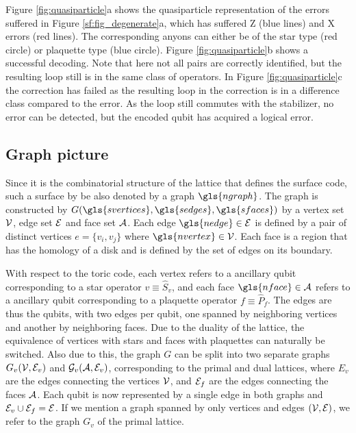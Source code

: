 Figure \ref{fig:quasiparticle}a shows the quasiparticle representation of the errors suffered in Figure \ref{sf:fig_degenerate}a, which has suffered Z (blue lines) and X errors (red lines). The corresponding anyons can either be of the star type (red circle) or plaquette type (blue circle). Figure \ref{fig:quasiparticle}b shows a successful decoding. Note that here not all pairs are correctly identified, but the resulting loop still is in the same class of operators. In Figure \ref{fig:quasiparticle}c the correction has failed as the resulting loop in the correction is in a difference class compared to the error. As the loop still commutes with the stabilizer, no error can be detected, but the encoded qubit has acquired a logical error.


\subsection{Graph picture}\label{sec:toricgraph}
Since it is the combinatorial structure of the lattice that defines the surface code, such a surface by be also denoted by a graph $\gls{ngraph}$. The graph is constructed by $G(\gls{svertices}, \gls{sedges}, \gls{sfaces})$ by a vertex set $\mathcal{V}$, edge set $\mathcal{E}$ and face set $\mathcal{A}$. Each edge $\gls{nedge}\in \m{E}$ is defined by a pair of distinct vertices $e=\{v_i, v_j\}$ where $\gls{nvertex}\in \m{V}$. Each face is a region that has the homology of a disk and is defined by the set of edges on its boundary. 

With respect to the toric code, each vertex refers to a ancillary qubit corresponding to a star operator $v\equiv \hat{S}_v$, and each face $\gls{nface}\in \m{A}$ refers to a ancillary qubit corresponding to a plaquette operator $f\equiv \hat{P}_f$. The edges are thus the qubits, with two edges per qubit, one spanned by neighboring vertices and another by neighboring faces. Due to the duality of the lattice, the equivalence of vertices with stars and faces with plaquettes can naturally be switched. Also due to this, the graph $G$ can be split into two separate graphs $G_v(\mathcal{V}, \mathcal{E}_v)$ and $\mathcal{G}_v(\mathcal{A}, \mathcal{E}_v)$, corresponding to the primal and dual lattices, where $E_v$ are the edges connecting the vertices $\mathcal{V}$, and $\mathcal{E}_f$ are the edges connecting the faces $\mathcal{A}$. Each qubit is now represented by a single edge in both graphs and $\mathcal{E}_v\cup \mathcal{E}_f=\mathcal{E}$. If we mention a graph spanned by only vertices and edges $(\mathcal{V},\mathcal{E})$, we refer to the graph $G_v$ of the primal lattice. 

